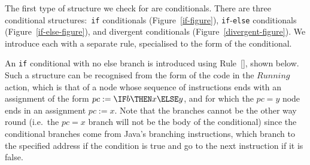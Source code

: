 The first type of structure we check for are conditionals.
There are three conditional structures:~\texttt{if} conditionals
(Figure~\ref{if-figure}), \texttt{if}-\texttt{else} conditionals
(Figure~\ref{if-else-figure}), and divergent conditionals
(Figure~\ref{divergent-figure}).
We introduce each with a separate rule, specialised to the form of the
conditional.

An \texttt{if} conditional with no else branch is introduced using
Rule~[], shown below.
Such a structure can be recognised from the form of the \Circus{} code
in the $Running$ action, which is that of a node whose sequence of
instructions ends with an assignment of the form
$pc := \IF b \THEN x \ELSE y$, and for which the $pc = y$ node ends in
an assignment $pc := x$.
Note that the branches cannot be the other way round (i.e.\ the
$pc = x$ branch will not be the body of the conditional) since the
conditional branches come from Java's branching instructions, which
branch to the specified address if the condition is true and go to the
next instruction if it is false.
